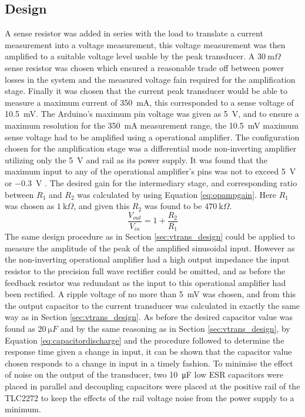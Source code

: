 \subsection{Design} \label{sec:itrans_design}
A sense resistor was added in series with the load to translate a current measurement into a voltage measurement, this voltage measurement was then amplified to a suitable voltage level usable by the peak transducer. A $\SI{30}{\milli \Omega}$ sense resistor was chosen which ensured a reasonable trade off between power losses in the system and the measured voltage fain required for the amplification stage. Finally it was chosen that the current peak transducer would be able to measure a maximum current of \SI{350}{\milli A}, this corresponded to a sense voltage of \SI{10.5}{\milli V}. The Arduino's maximum pin voltage was given as \SI{5}{\volt}, and to ensure a maximum resolution for the \SI{350}{\milli A} measurement range, the \SI{10.5}{\milli V} maximum sense voltage had to be amplified using a operational amplifier. The configuration chosen for the amplification stage was a differential mode non-inverting amplifier utilizing only the \SI{5}{\volt} and rail as its power supply. It was found that the maximum input to any of the operational amplifier's pins was not to exceed \SI{5}{\volt} or \SI{-0.3}{\volt} \cite{TLC2272:2016}.
The desired gain for the intermediary stage, and corresponding ratio between $R_1$ and $R_2$ was calculated by using Equation \ref{eq:opampgain}. Here $R_1$ was chosen as $\SI{1}{\kilo \Omega}$, and given this $R_2$ was found to be $\SI{470}{\kilo \Omega}$.\newline
\begin{equation}
   \frac{V_{out}}{V_{in}}=1+\frac{R_2}{R_1} 
   \label{eq:opampgain}
\end{equation}
The same design procedure as in Section \ref{sec:vtrans_design} could be applied to measure the amplitude of the peak of the amplified sinusoidal input. However as the non-inverting operational amplifier had a high output impedance the input resistor to the precision full wave rectifier could be omitted, and as before the feedback resistor was redundant as the input to this operational amplifier had been rectified. A ripple voltage of no more than \SI{5}{\milli \volt} was chosen, and from this the output capacitor to the current transducer was calculated in exactly the same way as in Section \ref{sec:vtrans_design}. \vspace{4mm} \newline
As before the desired capacitor value was found as $\SI{20}{\micro F}$ and by the same reasoning as in Section \ref{sec:vtrans_design}, by Equation \ref{eq:capacitordischarge} and the procedure followed to determine the response time given a change in input, it can be shown that the capacitor value chosen responds to a change in input in a timely fashion. To minimise the effect of noise on the output of the transducer, two \SI{10}{\micro F} low ESR capacitors were placed in parallel and decoupling capacitors were placed at the positive rail of the TLC2272 to keep the effects of the rail voltage noise from the power supply to a minimum.
 
